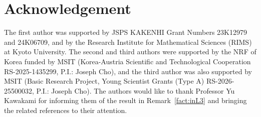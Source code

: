 \documentclass[12pt,a4paper,reqno]{amsart}
\theoremstyle{plain} %
\theoremstyle{definition}
\begin{document}
\section*{Acknowledgement}
% 
The first author was supported by JSPS KAKENHI Grant Numbers 23K12979 and 24K06709, and by the Research Institute for Mathematical Sciences (RIMS) at Kyoto University. The second and third authors were supported by the NRF of Korea funded by MSIT (Korea-Austria Scientific and Technological Cooperation RS-2025-1435299, P.I.: Joseph Cho), and the third author was also supported by MSIT (Basic Research Project, Young Scientist Grants (Type A) RS-2026-25500032, P.I.: Joseph Cho). The authors would like to thank Professor Yu Kawakami for informing them of the result in Remark~\ref{fact:inL3} and bringing the related references to their attention.
 
\end{document}
